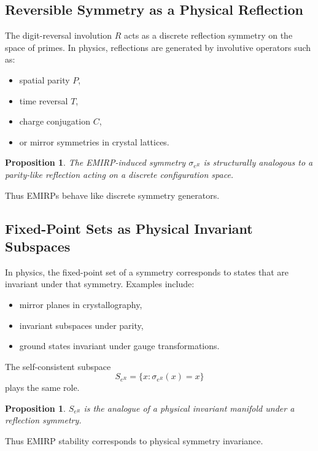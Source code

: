 \documentclass[11pt]{article}
\theoremstyle{definition}
\theoremstyle{plain}
\newtheorem{proposition}[definition]{Proposition}
\theoremstyle{remark}
\begin{document}
\subsection{Reversible Symmetry as a Physical Reflection}

The digit-reversal involution $R$ acts as a discrete reflection symmetry
on the space of primes. In physics, reflections are generated by
involutive operators such as:

\begin{itemize}
    \item spatial parity $P$,
    \item time reversal $T$,
    \item charge conjugation $C$,
    \item or mirror symmetries in crystal lattices.
\end{itemize}

\begin{proposition}
The EMIRP-induced symmetry $\sigma_{e^R}$ is structurally analogous to a
parity-like reflection acting on a discrete configuration space.
\end{proposition}

Thus EMIRPs behave like discrete symmetry generators.

\subsection{Fixed-Point Sets as Physical Invariant Subspaces}

In physics, the fixed-point set of a symmetry corresponds to states that
are invariant under that symmetry. Examples include:

\begin{itemize}
    \item mirror planes in crystallography,
    \item invariant subspaces under parity,
    \item ground states invariant under gauge transformations.
\end{itemize}

The self-consistent subspace
\[
S_{e^R} = \{x : \sigma_{e^R}(x) = x\}
\]
plays the same role.

\begin{proposition}
$S_{e^R}$ is the analogue of a physical invariant manifold under a
reflection symmetry.
\end{proposition}

Thus EMIRP stability corresponds to physical symmetry invariance.
\end{document}
